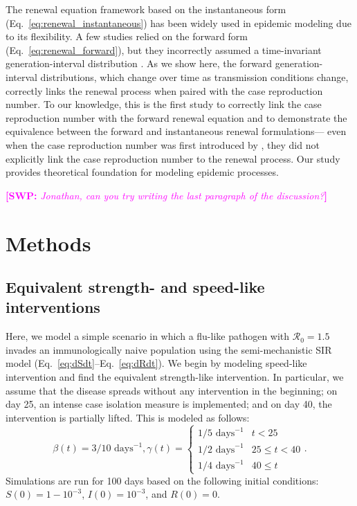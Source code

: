 \documentclass[12pt]{article}
\newcommand{\comment}{\showcomment}
\newcommand{\showcomment}[3]{\textcolor{#1}{\textbf{[#2: }\textsl{#3}\textbf{]}}}
\newcommand{\swp}[1]{\comment{magenta}{SWP}{#1}}
\newcommand{\eref}[1]{Eq.~\ref{eq:#1}}
\newcommand{\Rx}[1]{\ensuremath{{\mathcal R}_{#1}}\xspace}
\newcommand{\Ro}{\Rx{0}}
\begin{document}
The renewal equation framework based on the instantaneous form (\eref{renewal_instantaneous}) has been widely used in epidemic modeling due to its flexibility.
A few studies relied on the forward form (\eref{renewal_forward}), but they incorrectly assumed a time-invariant generation-interval distribution \citep{nishiura2007time,alvarez2020variational,white2021statistical}.
As we show here, the forward generation-interval distributions, which change over time as transmission conditions change, correctly links the renewal process when paired with the case reproduction number.
To our knowledge, this is the first study to correctly link the case reproduction number with the forward renewal equation and to demonstrate the equivalence between the forward and instantaneous renewal formulations---
even when the case reproduction number was first introduced by \cite{wallinga2004different}, they did not explicitly link the case reproduction number to the renewal process.
Our study provides theoretical foundation for modeling epidemic processes.

\swp{Jonathan, can you try writing the last paragraph of the discussion?}

\section{Methods}

\subsection{Equivalent strength- and speed-like interventions}

Here, we model a simple scenario in which a flu-like pathogen with $\Ro = 1.5$ invades an immunologically naive population using the semi-mechanistic SIR model (\eref{dSdt}--\eref{dRdt}).
We begin by modeling speed-like intervention and find the equivalent strength-like intervention.  
In particular, we assume that the disease spreads without any intervention in the beginning;
on day 25, an intense case isolation measure is implemented; and
on day 40, the intervention is partially lifted.
This is modeled as follows:
\begin{equation}
\beta(t) = 3/10\,\,\textrm{days}^{-1}, \gamma(t) = \begin{cases}
1/5\,\, \textrm{days}^{-1} & t < 25\\
1/2\,\, \textrm{days}^{-1} & 25 \leq t < 40 \\
1/4\,\, \textrm{days}^{-1} & 40 \leq t
\end{cases}.
\end{equation}
Simulations are run for 100 days based on the following initial conditions: $S(0) = 1 - 10^{-3}$, $I(0) = 10^{-3}$, and $R(0) = 0$.
\end{document}
